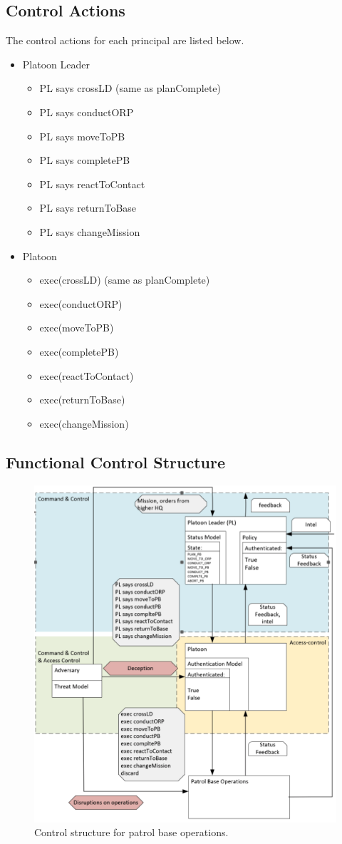 \documentclass[../../main/main.tex]{subfiles}
\begin{document}
\subsection{Control Actions}
The control actions for each principal are listed below.
\begin{itemize}
\item Platoon Leader
\begin{itemize}
\item PL says crossLD (same as planComplete)
\item PL says conductORP
\item PL says moveToPB
\item PL says completePB
\item PL says reactToContact
\item PL says returnToBase
\item PL says changeMission
\end{itemize}
\item Platoon
\begin{itemize}
\item exec(crossLD) (same as planComplete)
\item exec(conductORP)
\item exec(moveToPB)
\item exec(completePB)
\item exec(reactToContact)
\item exec(returnToBase)
\item exec(changeMission)
\end{itemize}

\end{itemize}

\subsection{Functional Control Structure}
\clearpage

\begin{figure}[ht!]
\begin{center}
\includegraphics[width=0.7\linewidth]{../figures/controlstr1}
\caption{Control structure for patrol base operations.}
\label{controlstr1}
\end{center}
\end{figure}
\end{document}
